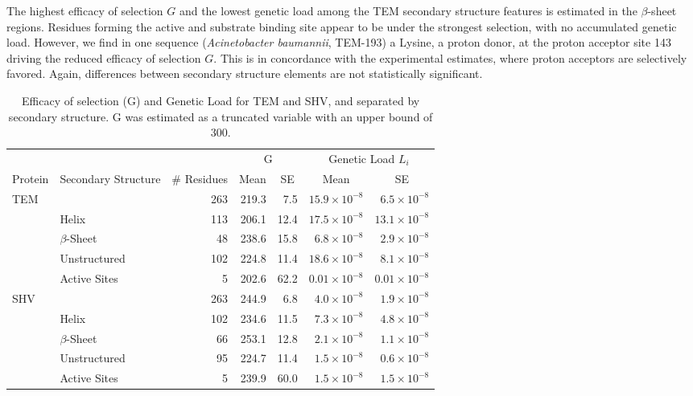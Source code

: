 The highest efficacy of selection $G$ and the lowest genetic load among the TEM secondary structure features is estimated in the $\beta$-sheet regions.
Residues forming the active and substrate binding site appear to be under the strongest selection, with no accumulated genetic load.
However, we find in one sequence (\textit{Acinetobacter baumannii}, TEM-193) a Lysine, a proton donor, at the proton acceptor site 143 driving the reduced efficacy of selection $G$. 
This is in concordance with the experimental estimates, where proton acceptors are selectively favored.
Again, differences between secondary structure elements are not statistically significant.

\begin{table}
  \centering
  \caption{Efficacy of selection (G) and Genetic Load for TEM and SHV, and separated by secondary structure. G was estimated as a truncated variable with an upper bound of 300.}
  \begin{tabular}{llrrrrr}
    & & & \multicolumn{2}{c}{G} & \multicolumn{2}{c}{Genetic Load $L_i$} \\ 
    Protein & Secondary Structure & \# Residues	& \multicolumn{1}{c}{Mean} & \multicolumn{1}{c}{SE} & \multicolumn{1}{c}{Mean} & \multicolumn{1}{c}{SE} \\ \hline 
    TEM	&		& 263 & 219.3 & 7.5  & $15.9\times10^{-8}$ & $6.5\times10^{-8}$ \\
    &Helix 		& 113 & 206.1 & 12.4 & $17.5\times10^{-8}$ & $13.1\times10^{-8}$ \\
    &$\beta$-Sheet 	&  48 & 238.6 & 15.8 & $ 6.8\times10^{-8}$ & $2.9\times10^{-8}$ \\
    &Unstructured 	& 102 & 224.8 & 11.4 & $18.6\times10^{-8}$ & $8.1\times10^{-8}$ \\
    &Active Sites 	&   5 & 202.6 & 62.2 & $0.01\times10^{-8}$& $0.01\times10^{-8}$ \\ \hline
    
    SHV&		& 263 & 244.9 & 6.8  & $4.0\times10^{-8}$ & $1.9\times10^{-8}$ \\
    &Helix		& 102 & 234.6 & 11.5 & $7.3\times10^{-8}$ & $4.8\times10^{-8}$ \\
    &$\beta$-Sheet 	&  66 & 253.1 & 12.8 & $2.1\times10^{-8}$ & $1.1\times10^{-8}$ \\
    &Unstructured	&  95 & 224.7 & 11.4 & $1.5\times10^{-8}$ & $0.6\times10^{-8}$  \\
    &Active Sites	&   5 & 239.9 & 60.0 & $1.5\times10^{-8}$ & $1.5\times10^{-8}$ \\

  \end{tabular}
  \label{tab:selection}
\end{table}

